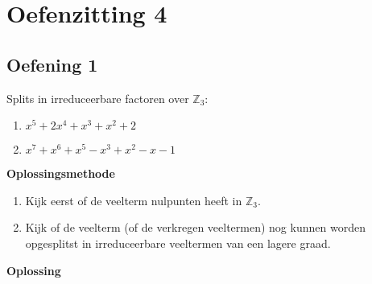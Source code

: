 \documentclass[11pt,a4paper,titlepage]{article}
\begin{document}
\section{Oefenzitting 4}
\subsection{Oefening 1}
Splits in irreduceerbare factoren over $\mathbb{Z}_3$:
\begin{enumerate}[label=(\alph*)]	
	\item $x^5+2x^4+x^3+x^2+2$
	\item $x^7+x^6+x^5-x^3+x^2-x-1$
\end{enumerate}
\textbf{Oplossingsmethode}
\begin{enumerate}
	\item Kijk eerst of de veelterm nulpunten heeft in $\mathbb{Z}_3$.
	\item Kijk of de veelterm (of de verkregen veeltermen) nog kunnen worden opgesplitst in irreduceerbare veeltermen van een lagere graad.
\end{enumerate}
\textbf{Oplossing}
\end{document}

